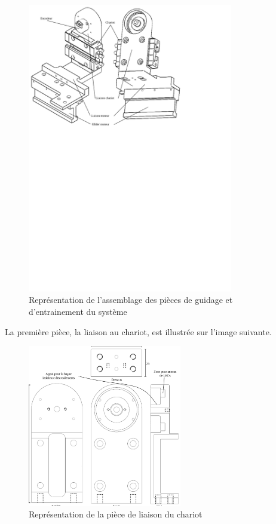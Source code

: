 \begin{figure}[H]
    \centering
    \includegraphics[width = 0.8\textwidth]{assets/figures/AssemblageGuidageEntrainement.svg}
    \caption{Représentation de l'assemblage des pièces de guidage et d'entrainement du système}
    \label{fig:AssGuiEntr}
\end{figure}

La première pièce, la liaison au chariot, est illustrée sur l'image suivante.

\begin{figure}[H]
    \centering
    \includegraphics[width = 0.6\textwidth]{assets/figures/LiaisonChariot.svg}
    \caption{Représentation de la pièce de liaison du chariot}
    \label{fig:LiaisonChariot}
\end{figure}

